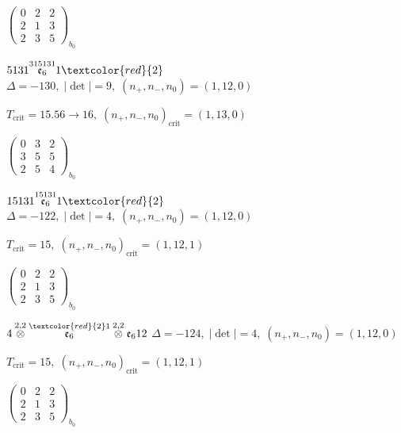 \documentclass[10pt]{article}
\begin{document}
\hspace{2em}$\left(\begin{smallmatrix}0 & 2 & 2 \\ 2 & 1 & 3 \\ 2 & 3 & 5\end{smallmatrix}\right)_{\!b_0}$

\smallskip

$5131\overset{315131}{\mathfrak{e}_6}1\textcolor{red}{2}$ \quad $\Delta=-130,\; |\det|=9,\; (n_+,n_-,n_0)=(1,12,0)$

\hspace{1em}$T_{\text{crit}}=15.56 \to 16,\; (n_+,n_-,n_0)_{\text{crit}}=(1,13,0)$

\hspace{2em}$\left(\begin{smallmatrix}0 & 3 & 2 \\ 3 & 5 & 5 \\ 2 & 5 & 4\end{smallmatrix}\right)_{\!b_0}$

\smallskip

$15131\overset{15131}{\mathfrak{e}_6}1\textcolor{red}{2}$ \quad $\Delta=-122,\; |\det|=4,\; (n_+,n_-,n_0)=(1,12,0)$

\hspace{1em}$T_{\text{crit}}=15,\; (n_+,n_-,n_0)_{\text{crit}}=(1,12,1)$

\hspace{2em}$\left(\begin{smallmatrix}0 & 2 & 2 \\ 2 & 1 & 3 \\ 2 & 3 & 5\end{smallmatrix}\right)_{\!b_0}$

\smallskip

$4\overset{2,2}{\otimes}\overset{\textcolor{red}{2}1}{\mathfrak{e}_6}\overset{2,2}{\otimes}\mathfrak{e}_612$ \quad $\Delta=-124,\; |\det|=4,\; (n_+,n_-,n_0)=(1,12,0)$

\hspace{1em}$T_{\text{crit}}=15,\; (n_+,n_-,n_0)_{\text{crit}}=(1,12,1)$

\hspace{2em}$\left(\begin{smallmatrix}0 & 2 & 2 \\ 2 & 1 & 3 \\ 2 & 3 & 5\end{smallmatrix}\right)_{\!b_0}$
\end{document}
